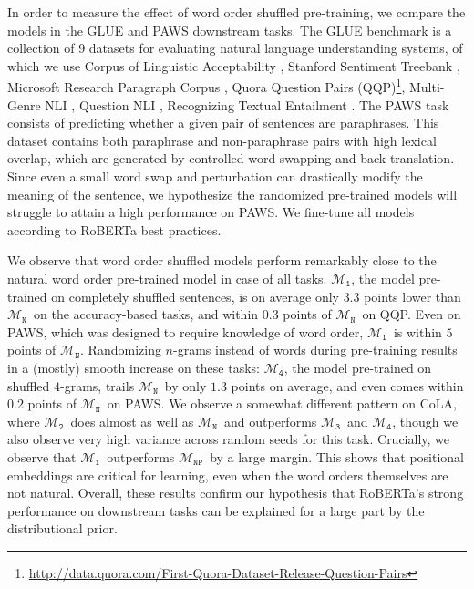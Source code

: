 \documentclass[12pt]{article}
\newcommand{\OR}{$\mathcal{M}_{\texttt{N}}$}
\newcommand{\RI}{$\mathcal{M}_{\texttt{1}}$}
\newcommand{\RII}{$\mathcal{M}_{\texttt{2}}$}
\newcommand{\RIII}{$\mathcal{M}_{\texttt{3}}$}
\newcommand{\RIV}{$\mathcal{M}_{\texttt{4}}$}
\newcommand{\NP}{$\mathcal{M}_{\texttt{NP}}$}
\begin{document}
In order to measure the effect of word order shuffled pre-training, we compare the models in the GLUE and PAWS downstream tasks. The GLUE \cite{wang2018glue} benchmark is a collection of 9 datasets for evaluating natural language understanding systems, of which we use Corpus of Linguistic Acceptability \cite[CoLA,][]{cola_warstadt2019neural}, Stanford Sentiment Treebank \cite[SST,][]{sst2_socher2013recursive}, Microsoft Research Paragraph Corpus \cite[MRPC,][]{mrpc_dolan2005automatically}, Quora Question Pairs (QQP)\footnote{\href{http://data.quora.com/First-Quora-Dataset-Release-Question-Pairs}{http://data.quora.com/First-Quora-Dataset-Release-Question-Pairs}}, Multi-Genre NLI \cite[MNLI,][]{williams-etal-2018-broad}, Question NLI \cite[QNLI,][]{qnli_rajpurkar2016squad, qnli_2_demszky2018transforming}, Recognizing Textual Entailment \cite[RTE,][]{rte1_dagan2005pascal, rte2_haim2006second, rte3_giampiccolo2007third, rte5_bentivogli2009fifth}. The PAWS task \cite{zhang2019paws} consists of predicting whether a given pair of sentences are paraphrases. This dataset contains both paraphrase and non-paraphrase pairs with high lexical overlap, which are generated by controlled word swapping and back translation. Since even a small word swap and perturbation can drastically modify the meaning of the sentence, we hypothesize the randomized pre-trained models will struggle to attain a high performance on PAWS. We fine-tune all models according to RoBERTa best practices.

We observe that word order shuffled models perform remarkably close to the natural word order pre-trained model in case of all tasks. \RI, the model pre-trained on completely shuffled sentences, is on average only $3.3$ points lower than \OR\ on the accuracy-based tasks,
and within $0.3$ points of \OR\ on QQP.
Even on PAWS, which was designed to require knowledge of word order, \RI\ is within $5$ points of \OR.
Randomizing $n$-grams instead of words during pre-training results in a (mostly) smooth increase on these tasks: \RIV, the model pre-trained on shuffled $4$-grams, trails \OR\ by only $1.3$ points on average, and even comes within $0.2$ points of \OR\ on PAWS. We observe a somewhat different pattern on CoLA, where \RII\ does almost as well as \OR\ and outperforms \RIII\ and \RIV, though we also observe very high variance across random seeds for this task.
Crucially, we observe that \RI\ outperforms \NP\ by a large margin. This shows that positional embeddings are critical for learning, even when the word orders themselves are not natural.
Overall, these results confirm our hypothesis that RoBERTa's strong performance on downstream tasks can be explained for a large part by the distributional prior.
\end{document}

